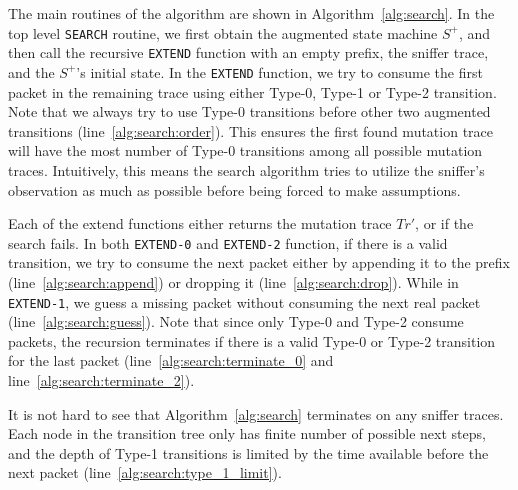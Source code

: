 The main routines of the algorithm are shown in Algorithm~\ref{alg:search}.  In
the top level \texttt{SEARCH} routine, we first obtain the augmented state
machine $S^+$, and then call the recursive \texttt{EXTEND} function with an empty
prefix, the sniffer trace, and the $S^+$'s initial state. 
In the \texttt{EXTEND} function, we try to consume the first packet in the
remaining trace using either Type-0, Type-1 or Type-2 transition.
Note that we always try to use Type-0 transitions before other two augmented
transitions (line~\ref{alg:search:order}).
This ensures the first found mutation trace will have the most number of Type-0
transitions among all possible mutation traces.
Intuitively, this means the search algorithm tries to utilize the sniffer's
observation as much as possible before being forced to make assumptions.


Each of the extend functions either returns the mutation trace $Tr'$, or
\textit{\nil} if the search fails.
In both \texttt{EXTEND-0} and
\texttt{EXTEND-2} function, if there is a valid transition, we try to consume
the next packet either by appending it to the prefix
(line~\ref{alg:search:append}) or dropping it (line~\ref{alg:search:drop}).
While in \texttt{EXTEND-1}, we guess a missing packet without consuming the next
real packet (line~\ref{alg:search:guess}).
Note that since only Type-0 and Type-2 consume packets, the recursion terminates
if there is a valid Type-0 or Type-2 transition for the last packet
(line~\ref{alg:search:terminate_0} and line~\ref{alg:search:terminate_2}).



It is not hard to see that Algorithm~\ref{alg:search} terminates on any sniffer
traces. Each node in the transition tree only has finite number of possible next
steps, and the depth of Type-1 transitions is limited by the time available
before the next packet (line~\ref{alg:search:type_1_limit}).
